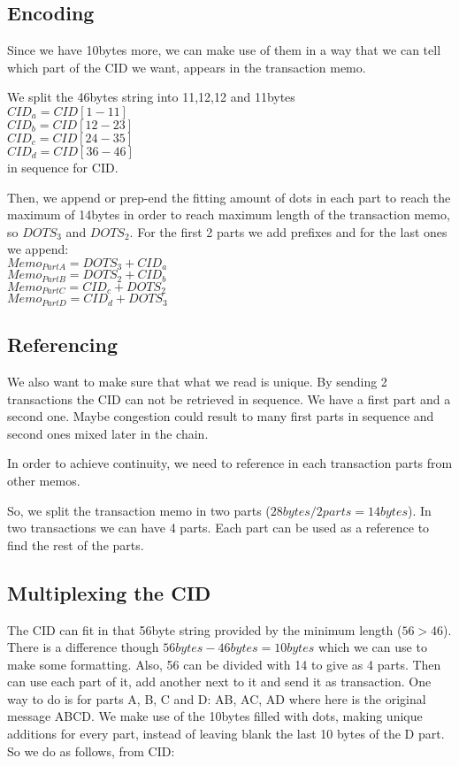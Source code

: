 \documentclass[10pt,a4paper]{paper}
\begin{document}
	\subsection{Encoding}\label{encoding}
	Since we have 10bytes more, we can make use of them in a way that we can tell which part of the CID we want, appears in the transaction memo.
	
	We split the 46bytes string into 11,12,12 and 11bytes\\
	$ CID_{a} = CID[1-11] $\\
	$ CID_{b} = CID[12-23] $\\
	$ CID_{c} = CID[24-35] $\\
	$ CID_{d} = CID[36-46] $\\in sequence for CID.
	
	Then, we append or prep-end the fitting amount of dots in each part to reach the maximum of 14bytes in order to reach maximum length of the transaction memo, so $DOTS_{3}$ and $DOTS_{2}$. For the first 2 parts we add prefixes and for the last ones we append:\\
		$ Memo_{PartA} = DOTS_{3} + CID_{a} $\\
		$ Memo_{PartB} = DOTS_{2} + CID_{b} $\\
		$ Memo_{PartC} = CID_{c} + DOTS_{2} $\\
		$ Memo_{PartD} = CID_{d} + DOTS_{3} $

	\subsection{Referencing}\label{referencing}
	We also want to make sure that what we read is unique. By sending 2 transactions the CID can not be retrieved in sequence. We have a first part and a second one. Maybe congestion could result to many first parts in sequence and second ones mixed later in the chain.
	
	In order to achieve continuity, we need to reference in each transaction parts from other memos.
	
	
	So, we split the transaction memo in two parts ($ 28bytes/2parts=14bytes $). In two transactions we can have 4 parts. Each part can be used as a reference to find the rest of the parts.
	
	\subsection{Multiplexing the CID}\label{multiplexing}
	The CID can fit in that 56byte string provided by the minimum length ($ 56>46 $). There is a difference though $ 56bytes-46bytes=10bytes $ which we can use to make some formatting. Also, 56 can be divided with 14 to give as 4 parts. Then can use each part of it, add another next to it and send it as transaction. One way to do is for parts A, B, C and D: AB, AC, AD where here is the original message ABCD. We make use of the 10bytes filled with dots, making unique additions for every part, instead of leaving blank the last 10 bytes of the D part. So we do as follows, from CID:
\end{document}
